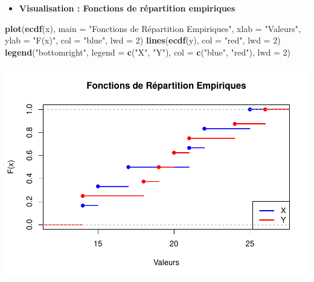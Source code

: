\documentclass[
  12pt,
]{article}
\newenvironment{Shaded}{\begin{snugshade}}{\end{snugshade}}
\newcommand{\AttributeTok}[1]{\textcolor[rgb]{0.13,0.29,0.53}{#1}}
\newcommand{\DecValTok}[1]{\textcolor[rgb]{0.00,0.00,0.81}{#1}}
\newcommand{\FunctionTok}[1]{\textcolor[rgb]{0.13,0.29,0.53}{\textbf{#1}}}
\newcommand{\NormalTok}[1]{#1}
\newcommand{\StringTok}[1]{\textcolor[rgb]{0.31,0.60,0.02}{#1}}
\providecommand{\tightlist}{%
  \setlength{\itemsep}{0pt}\setlength{\parskip}{0pt}}
\begin{document}
\begin{itemize}
\tightlist
\item
  \textbf{Visualisation : Fonctions de répartition empiriques}
\end{itemize}

\begin{Shaded}
\begin{Highlighting}[]
\FunctionTok{plot}\NormalTok{(}\FunctionTok{ecdf}\NormalTok{(x), }\AttributeTok{main =} \StringTok{"Fonctions de Répartition Empiriques"}\NormalTok{, }\AttributeTok{xlab =} \StringTok{"Valeurs"}\NormalTok{, }
     \AttributeTok{ylab =} \StringTok{"F(x)"}\NormalTok{, }\AttributeTok{col =} \StringTok{"blue"}\NormalTok{, }\AttributeTok{lwd =} \DecValTok{2}\NormalTok{)}
\FunctionTok{lines}\NormalTok{(}\FunctionTok{ecdf}\NormalTok{(y), }\AttributeTok{col =} \StringTok{"red"}\NormalTok{, }\AttributeTok{lwd =} \DecValTok{2}\NormalTok{)}
\FunctionTok{legend}\NormalTok{(}\StringTok{"bottomright"}\NormalTok{, }\AttributeTok{legend =} \FunctionTok{c}\NormalTok{(}\StringTok{"X"}\NormalTok{, }\StringTok{"Y"}\NormalTok{), }\AttributeTok{col =} \FunctionTok{c}\NormalTok{(}\StringTok{"blue"}\NormalTok{, }\StringTok{"red"}\NormalTok{), }\AttributeTok{lwd =} \DecValTok{2}\NormalTok{)}
\end{Highlighting}
\end{Shaded}

\includegraphics{Stat_non_para_files/figure-latex/unnamed-chunk-72-1.pdf}
\end{document}
